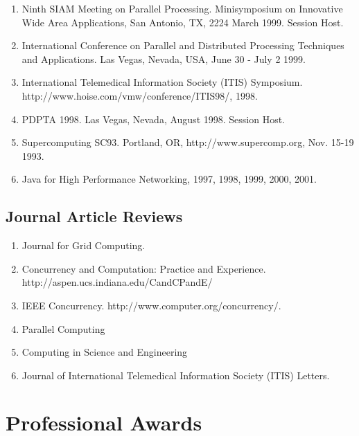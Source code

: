 \documentclass{article}
\begin{document}
\begin{enumerate}
\item  Ninth SIAM Meeting on Parallel Processing. Minisymposium on Innovative Wide Area Applications, San Antonio, TX, 2224 March 1999. Session Host. 
\item  International Conference on Parallel and Distributed Processing Techniques and Applications. Las Vegas, Nevada, USA, June 30 - July 2 1999. 
\item  International Telemedical Information Society (ITIS) Symposium. http://www.hoise.com/vmw/conference/ITIS98/, 1998. 
\item  PDPTA 1998. Las Vegas, Nevada, August 1998. Session Host. 
\item  Supercomputing SC93. Portland, OR, http://www.supercomp.org, Nov. 15-19 1993. 
\item  Java for High Performance Networking, 1997, 1998, 1999, 2000, 2001. 
\end{enumerate}
    
\subsection{Journal Article Reviews}

\begin{enumerate}
\item  Journal for Grid Computing. 
\item  Concurrency and Computation: Practice and Experience. http://aspen.ucs.indiana.edu/CandCPandE/ 
\item  IEEE Concurrency. http://www.computer.org/concurrency/. 
\item  Parallel Computing 
\item  Computing in Science and Engineering
\item  Journal of International Telemedical Information Society (ITIS) Letters. 
\end{enumerate}

\section{Professional Awards}   
\end{document}
